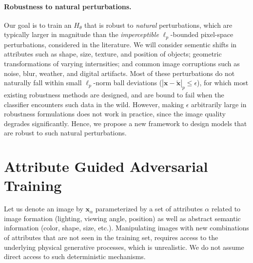 \paragraph{Robustness to natural perturbations.}
Our goal is to train an $H_{\theta}$ that is robust to \emph{natural} perturbations, which are typically larger in magnitude than the \emph{imperceptible} $\ell_p$-bounded pixel-space perturbations, considered in the literature.
We will consider sementic shifts in attributes such as shape, size, texture, and position of objects; geometric transformations of varying internsities; and common image corruptions such as noise, blur, weather, and digital artifacts.
Most of these perturbations do not naturally fall within small $\ell_p$-norm ball deviations ($|\mathbf{x}-\tilde{\mathbf{x}}|_p\leq \epsilon$), for which most existing robustness methods are designed, and are bound to fail when the classifier encounters such data in the wild.
However, making $\epsilon$ arbitrarily large in robustness formulations does not work in practice, since the image quality degrades significantly. 
Hence, we propose a new framework to design models that are robust to such natural perturbations.

\section{Attribute Guided Adversarial Training}

Let us denote an image by $\mathbf{x}_\alpha$ parameterized by a set of attributes $\alpha$ related to image formation (lighting, viewing angle, position) as well as abstract semantic information (color, shape, size, etc.). 
Manipulating images with new combinations of attributes that are not seen in the training set, requires access to the underlying physical generative processes,  which is unrealistic. We do not assume direct access to such deterministic mechanisms.

